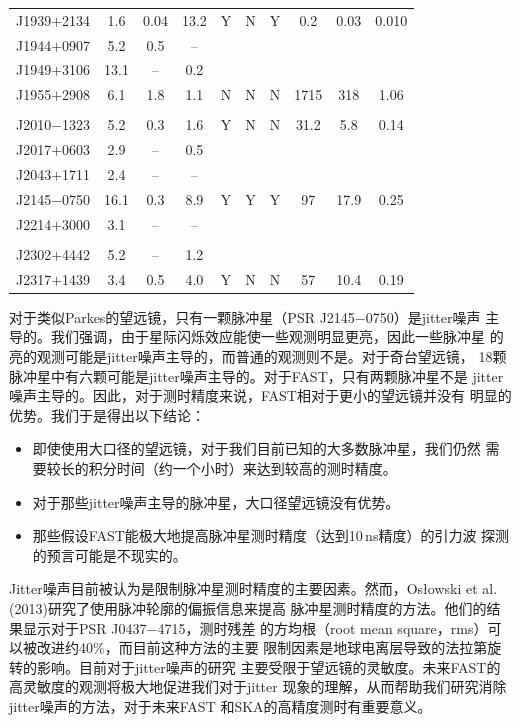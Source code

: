 \begin{table}
\begin{tabular}{lccccccccc}
J1939$+$2134 & 1.6 & 0.04 & 13.2 & Y & N & Y & 0.2 & 0.03 & 0.010 \\
J1944$+$0907 &  5.2& 0.5 & -- \\
J1949$+$3106 & 13.1& -- & 0.2 \\
J1955$+$2908 & 6.1 & 1.8 & 1.1 & N  & N & N & 1715 & 318 & 1.06 \\
\\
J2010$-$1323 & 5.2 & 0.3 & 1.6 & Y & N & N & 31.2 & 5.8 & 0.14 \\
J2017$+$0603 & 2.9 & -- & 0.5 \\
J2043$+$1711 & 2.4 & -- & -- \\
J2145$-$0750 & 16.1& 0.3 & 8.9 & Y  & Y & Y & 97 & 17.9 & 0.25 \\
J2214$+$3000 & 3.1 & -- & -- \\
\\
J2302$+$4442 & 5.2 & -- & 1.2 \\
J2317$+$1439 & 3.4 & 0.5 & 4.0 & Y & N & N & 57 & 10.4 & 0.19 \\
\hline
\end{tabular}
\end{table}

对于类似Parkes的望远镜，只有一颗脉冲星（PSR J2145$-$0750）是jitter噪声
主导的。我们强调，由于星际闪烁效应能使一些观测明显更亮，因此一些脉冲星
的亮的观测可能是jitter噪声主导的，而普通的观测则不是。对于奇台望远镜，
18颗脉冲星中有六颗可能是jitter噪声主导的。对于FAST，只有两颗脉冲星不是
jitter噪声主导的。因此，对于测时精度来说，FAST相对于更小的望远镜并没有
明显的优势。我们于是得出以下结论：
\begin{itemize}
\item 即使使用大口径的望远镜，对于我们目前已知的大多数脉冲星，我们仍然
需要较长的积分时间（约一个小时）来达到较高的测时精度。
\item 对于那些jitter噪声主导的脉冲星，大口径望远镜没有优势。
\item 那些假设FAST能极大地提高脉冲星测时精度（达到10\,ns精度）的引力波
探测的预言可能是不现实的。
\end{itemize}

Jitter噪声目前被认为是限制脉冲星测时精度的主要因素。然而，Os{\l}owski 
et al. (2013)\supercite{Oslowski13}研究了使用脉冲轮廓的偏振信息来提高
脉冲星测时精度的方法。他们的结果显示对于PSR J0437$-$4715，测时残差
的方均根（root mean square，rms）可以被改进约40\%，而目前这种方法的主要
限制因素是地球电离层导致的法拉第旋转的影响。目前对于jitter噪声的研究
主要受限于望远镜的灵敏度。未来FAST的高灵敏度的观测将极大地促进我们对于jitter
现象的理解，从而帮助我们研究消除jitter噪声的方法，对于未来FAST
和SKA的高精度测时有重要意义。

